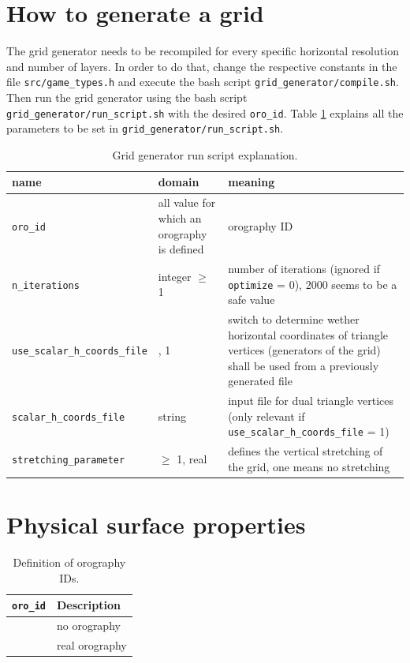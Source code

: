 \documentclass[10pt]{report}
\begin{document}
\section{How to generate a grid}
\label{sec:how_to_generate_a_grid}

The grid generator needs to be recompiled for every specific horizontal resolution and number of layers. In order to do that, change the respective constants in the file \texttt{src/game\_types.h} and execute the bash script \texttt{grid\_generator/compile.sh}. Then run the grid generator using the bash script \texttt{grid\_generator/run\_script.sh} with the desired \texttt{\texttt{oro\_id}}. Table \ref{tab:grid_generator_run_file_explanation} explains all the parameters to be set in \texttt{grid\_generator/run\_script.sh}.

\renewcommand{\arraystretch}{1.2}
\begin{table}
\centering
\begin{tabular}{|>{\centering}p{5.0 cm}|>{\centering}p{3 cm}|>{\centering}p{7 cm}|}
\hline \textbf{name} & \textbf{domain} & \textbf{meaning} \tabularnewline
\hline\hline \texttt{\texttt{oro\_id}} & all value for which an orography is defined & orography ID \tabularnewline
\hline\hline \texttt{n\_iterations} & integer $\geq$ 1 & number of iterations (ignored if \texttt{optimize} = 0), 2000 seems to be a safe value \tabularnewline
\hline\hline \texttt{use\_scalar\_h\_coords\_file} & 0, 1 & switch to determine wether horizontal coordinates of triangle vertices (generators of the grid) shall be used from a previously generated file \tabularnewline
\hline\hline \texttt{scalar\_h\_coords\_file} & string & input file for dual triangle vertices (only relevant if \texttt{use\_scalar\_h\_coords\_file} = 1) \tabularnewline
\hline\hline \texttt{stretching\_parameter} & $\geq$ 1, real & defines the vertical stretching of the grid, one means no stretching \tabularnewline
\hline
\end{tabular}
\caption{Grid generator run script explanation.}
\label{tab:grid_generator_run_file_explanation}
\end{table}
\renewcommand{\arraystretch}{1}

\section{Physical surface properties}
\label{sec:physical_surface_properties}

\renewcommand{\arraystretch}{1.2}
\begin{table}
\centering
\begin{tabular}{|>{\centering}p{4.0 cm}|>{\centering}p{8 cm}|}
\hline \textbf{\texttt{oro\_id}} & \textbf{Description} \tabularnewline
\hline\hline 0 & no orography \tabularnewline
\hline 1 & real orography \tabularnewline
\hline
\end{tabular}
\caption{Definition of orography IDs.}
\label{tab:oro_id_definition}
\end{table}
\renewcommand{\arraystretch}{1}
\end{document}
